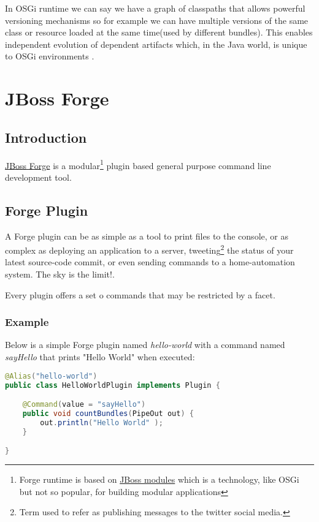 In OSGi runtime we can say we have a graph of classpaths that allows powerful versioning mechanisms so for example we can have multiple versions of the same class or resource loaded at the same time(used by different bundles). This enables independent evolution of dependent artifacts which, in the Java world, is unique to OSGi environments \citep{semantic versioning 2010}.   

\section{JBoss Forge}
\label{sec:forge}
\subsection{Introduction}
\href{http://forge.jboss.org/1.x/}{JBoss Forge} is a modular\footnote{Forge runtime is based on \href{https://docs.jboss.org/author/display/MODULES/Introduction}{JBoss modules} which is a technology, like OSGi but not so popular, for building modular applications} plugin based general purpose command line development tool. 

\subsection{Forge Plugin}
\label{sec:forge:plugin}
A Forge plugin can be as simple as a tool to print files to the console, or as complex as deploying an application to a server, tweeting\footnote{Term used to refer as publishing messages to the twitter social media.} the status of your latest source-code commit, or even sending commands to a home-automation system. The sky is the limit!. 

Every plugin offers a set o commands that may be restricted by a facet.

\subsubsection{Example}
Below is a simple Forge plugin named \emph{hello-world} with a command named \emph{sayHello} that prints "Hello World" when executed:

\begin{lstlisting}[language=java]
@Alias("hello-world")
public class HelloWorldPlugin implements Plugin {

    @Command(value = "sayHello")
    public void countBundles(PipeOut out) {
        out.println("Hello World" );
    }

}
\end{lstlisting}

